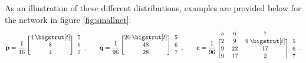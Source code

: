 As an illustration of these different distributions, examples %
are provided below for the network in figure \ref{fig:smallnet}:%
\begin{align}
	\mathbf{p} =  \frac{1}{16} \, \begin{blockarray}{*{1}{c} l}
	\begin{block}{[*{1}{c}]>{$\footnotesize}l<{$}}
	4 \: \bigstrut[t]& 5\\
	8 & 6 \\
	4 & 7 \\
	\end{block}
	\end{blockarray},
	\qquad
	\mathbf{q} =  \frac{1}{96} \, \begin{blockarray}{*{1}{c} l}
	\begin{block}{[*{1}{c}]>{$\footnotesize}l<{$}}
	20 \: \bigstrut[t]& 5\\
	48 & 6 \\
	28 & 7 \\
	\end{block}
	\end{blockarray},
	\qquad	
	\mathbf{e} = \frac{1}{96}\: \begin{blockarray}{*{3}{c} l}
	\begin{block}{*{3}{>{$\footnotesize}c<{$}} l}
	5 & 6 & 7 \\
	\end{block}
	\begin{block}{[*{3}{c}]>{$\footnotesize}l<{$}}
	2 & 9 & 9 \: \bigstrut[t]& 5\\
	9 & 22 & 17 & 6 \\
	9 & 17 & 2 & 7\\
	\end{block}
	\end{blockarray}.
\end{align}

